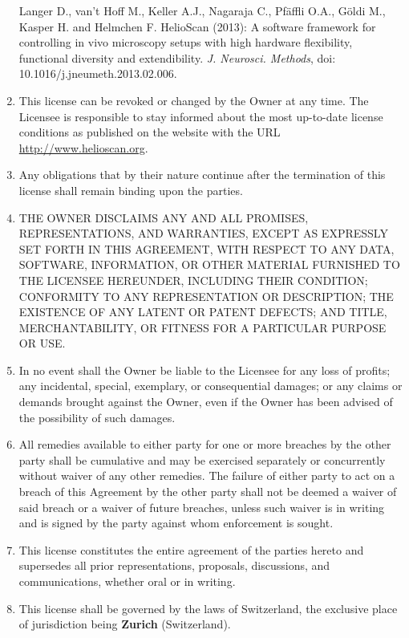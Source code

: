 \begin{enumerate}
 Langer D., van't Hoff M., Keller A.J., Nagaraja C., Pfäffli O.A., Göldi M., Kasper H. and Helmchen F. HelioScan (2013): A software framework for controlling in vivo microscopy setups with high hardware flexibility, functional diversity and extendibility. \textit{J. Neurosci. Methods}, doi: 10.1016/j.jneumeth.2013.02.006. 
	\item This license can be revoked or changed by the Owner at any time. The Licensee is responsible to stay informed about the most up-to-date license conditions as published on the website with the URL \url{http://www.helioscan.org}.
	\item Any obligations that by their nature continue after the termination of this license shall remain binding upon the parties.
	\item THE OWNER DISCLAIMS ANY AND ALL PROMISES, REPRESENTATIONS, AND WARRANTIES, EXCEPT AS EXPRESSLY SET FORTH IN THIS AGREEMENT, WITH RESPECT TO ANY DATA, SOFTWARE, INFORMATION, OR OTHER MATERIAL FURNISHED TO THE LICENSEE HEREUNDER, INCLUDING THEIR CONDITION; CONFORMITY TO ANY REPRESENTATION OR DESCRIPTION; THE EXISTENCE OF ANY LATENT OR PATENT DEFECTS; AND TITLE, MERCHANTABILITY, OR FITNESS FOR A PARTICULAR PURPOSE OR USE.
	\item In no event shall the Owner be liable to the Licensee for any loss of profits; any incidental, special, exemplary, or consequential damages; or any claims or demands brought against the Owner, even if the Owner has been advised of the possibility of such damages.
	\item All remedies available to either party for one or more breaches by the other party shall be cumulative and may be exercised separately or concurrently without waiver of any other remedies. The failure of either party to act on a breach of this Agreement by the other party shall not be deemed a waiver of said breach or a waiver of future breaches, unless such waiver is in writing and is signed by the party against whom enforcement is sought.
	\item This license constitutes the entire agreement of the parties hereto and supersedes all prior representations, proposals, discussions, and communications, whether oral or in writing.
	\item This license shall be governed by the laws of Switzerland, the exclusive place of jurisdiction being \textbf{Zurich} (Switzerland).
\end{enumerate}